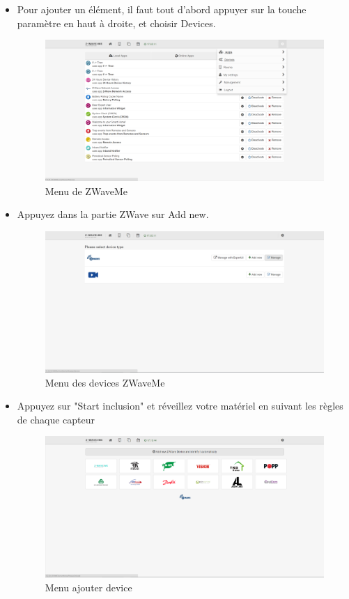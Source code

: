 \begin{itemize}

\item Pour ajouter un élément, il faut tout d'abord appuyer sur la touche paramètre en haut à droite, et choisir Devices.

\begin{figure}[h]
	\center
	\includegraphics[scale=0.5]{./Images/png/menu_zwaveme.png}
	\caption{Menu de ZWaveMe}
\end{figure}


\item Appuyez dans la partie ZWave sur Add new.


\begin{figure}[h]
	\center
	\includegraphics[scale=0.5]{./Images/png/devices_zwaveme.png}
	\caption{Menu des devices ZWaveMe}
\end{figure}


\item Appuyez sur "Start inclusion" et réveillez votre matériel en suivant les règles de chaque capteur

\begin{figure}[h]
	\center
	\includegraphics[scale=0.5]{./Images/png/add_zwaveme.png}
	\caption{Menu ajouter device}
\end{figure}


\end{itemize}
